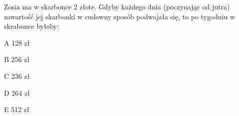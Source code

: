 \begin{tresc}
Zosia ma w skarbonce 2 złote. Gdyby każdego dnia (poczynając od jutra) zawartość jej skarbonki w cudowny sposób podwajała się, to po tygodniu w skrabonce byłoby:
\end{tresc}
\begin{wariant}{A} 128 zł \end{wariant}
\begin{wariant}{B} 256 zł \end{wariant}
\begin{wariant}{C} 236 zł \end{wariant}
\begin{wariant}{D} 264 zł \end{wariant}
\begin{wariant}{E} 512 zł \end{wariant}
